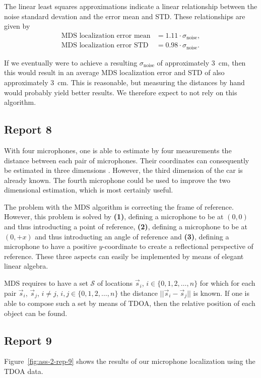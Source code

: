 \documentclass[11pt,titlepage]{report}
\begin{document}
The linear least squares approximations indicate a linear relationship between the noise standard devation and the error mean and STD. These relationships are given by
\begin{align*}
	\text{MDS localization error mean}&=1.11 \cdot \sigma_{\text{noise}}, \\
	\text{MDS localization error STD}&=0.98 \cdot \sigma_{\text{noise}}.
\end{align*}

If we eventually were to achieve a resulting $\sigma_{\text{noise}}$ of approximately \SI{3}{cm}, then this would result in an average MDS localization error and STD of also approximately \SI{3}{cm}. This is reasonable, but measuring the distances by hand would probably yield better results. We therefore expect to not rely on this algorithm.

\subsection{Report 8}
With four microphones, one is able to estimate by four measurements the distance between each pair of microphones. Their coordinates can consequently be estimated in three dimensions \cite{shang-wheeler-mds}. However, the third dimension of the car is already known. The fourth microphone could be used to improve the two dimensional estimation, which is most certainly useful.

The problem with the MDS algorithm is correcting the frame of reference. However, this problem is solved by \textbf{(1)}, defining a microphone to be at $(0,0)$ and thus introducting a point of reference, \textbf{(2)}, defining a microphone to be at $(0,+x)$ and thus introducting an angle of reference and \textbf{(3)}, defining a microphone to have a positive $y$-coordinate to create a reflectional perspective of reference. These three aspects can easily be implemented by means of elegant linear algebra.

MDS requires to have a set $\mathcal{S}$ of locations $\vec{s}_i$, $i \in \{0,1,2,\dots,n\}$ for which for each pair $\vec{s}_i$, $\vec{s}_j$, $i \neq j$, $i, j \in \{0,1,2,\dots,n\}$ the distance $||\vec{s}_i-\vec{s}_j||$ is known. If one is able to compose such a set by means of TDOA, then the relative position of each object can be found.

\subsection{Report 9}
\label{subsec:ass-2-rep-9}
Figure~\ref{fig:ass-2-rep-9} shows the results of our microphone localization using the TDOA data.
\end{document}
